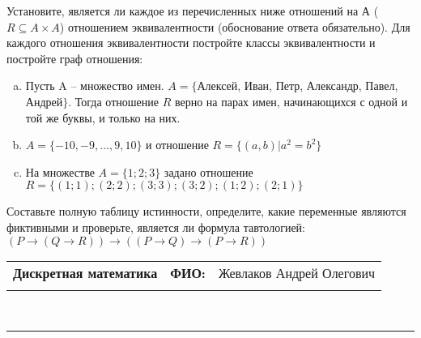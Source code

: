 \documentclass[10pt]{exam}
\newcommand{\class}{Дискретная математика}
\newcommand{\examdate}{}
\begin{document}
\begin{questions}
\question
Установите, является ли каждое из перечисленных ниже отношений на А ($R \subseteq A \times A$) отношением эквивалентности (обоснование ответа обязательно). Для каждого отношения эквивалентности постройте классы 
эквивалентности и постройте граф отношения:
\begin{enumerate} [a)]\setcounter{enumi}{0}
\item Пусть A – множество имен. $A = \{ $Алексей, Иван, Петр, Александр, Павел, Андрей$ \}$. Тогда отношение $R$ верно на парах имен, начинающихся с одной и той же буквы, и только на них.
\item $A = \{-10, -9, … , 9, 10\}$ и отношение $ R = \{(a,b)|a^{2} = b^{2}\}$
\item На множестве $A = \{1; 2; 3\}$ задано отношение $R = \{(1; 1); (2; 2); (3; 3); (3; 2); (1; 2); (2; 1)\}$
\end{enumerate}\question Составьте полную таблицу истинности, определите, какие переменные являются фиктивными и проверьте, является ли формула тавтологией:
$(P \rightarrow (Q \rightarrow R)) \rightarrow ((P \rightarrow Q) \rightarrow (P \rightarrow R))$

\end{questions}
\newpage
\begin{flushright}
\begin{tabular}{p{2.8in} r l}
\textbf{\class} & \textbf{ФИО:} &Жевлаков Андрей Олегович
\\

\textbf{\examdate} &&\\
\end{tabular}\\
\end{flushright}
\rule[1ex]{\textwidth}{.1pt}
\end{document}
